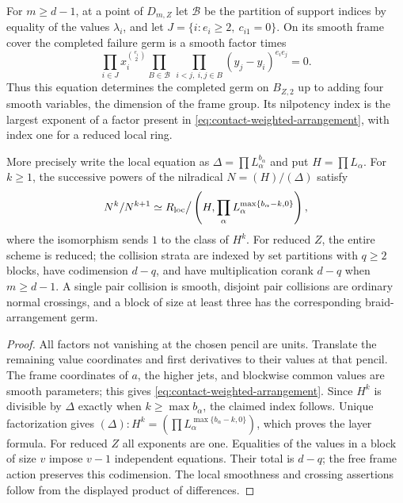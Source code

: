 \begin{corollary}
\label{cor:contact-local-structure}
For $m\ge d-1$, at a point of $D_{m,Z}$ let $\mathcal B$ be the partition of support indices
by equality of the values $\lambda_i$, and let
$J=\{i:e_i\ge2,\ c_{i1}=0\}$. On its smooth frame cover the
completed failure germ is a smooth factor times
\begin{equation}\label{eq:contact-weighted-arrangement}
 \prod_{i\in J}x_i^{\binom{e_i}{2}}
 \prod_{B\in\mathcal B}\ \prod_{i<j,\ i,j\in B}
               (y_j-y_i)^{e_i e_j}=0.
\end{equation}
Thus this equation determines the completed germ on $B_{Z,2}$
up to adding four smooth variables, the dimension of the frame
group. Its nilpotency index is the largest exponent of a factor
present in \eqref{eq:contact-weighted-arrangement}, with index one
for a reduced local ring.

More precisely write the local equation as $\Delta=\prod L_\alpha^{b_\alpha}$
and put $H=\prod L_\alpha$. For $k\ge1$, the successive powers
of the nilradical $N=(H)/(\Delta)$ satisfy
\begin{equation}\label{eq:contact-nilradical-layers}
 N^k/N^{k+1}
 \simeq R_{\rm loc}\big/
 \left(H,\prod_\alpha L_\alpha^{\max\{b_\alpha-k,0\}}\right),
\end{equation}
where the isomorphism sends $1$ to the class of $H^k$.
For reduced $Z$, the entire scheme is reduced; the collision
strata are indexed by set partitions with $q\ge2$ blocks, have
codimension $d-q$, and have multiplication corank $d-q$ when
$m\ge d-1$. A single pair collision is smooth, disjoint pair
collisions are ordinary normal crossings, and a block of size at
least three has the corresponding braid-arrangement germ.
\end{corollary}
\begin{proof}
All factors not vanishing at the chosen pencil are units. Translate
the remaining value coordinates and first derivatives to their
values at that pencil. The frame coordinates of $a$, the higher
jets, and blockwise common values are smooth parameters; this gives
\eqref{eq:contact-weighted-arrangement}. Since $H^k$ is divisible
by $\Delta$ exactly when $k\ge\max b_\alpha$, the claimed index
follows. Unique factorization gives
$(\Delta):H^k=(\prod L_\alpha^{\max\{b_\alpha-k,0\}})$,
which proves the layer formula. For reduced $Z$ all exponents are
one. Equalities of the values in a block of size $v$ impose $v-1$
independent equations. Their total is $d-q$; the free frame action
preserves this codimension. The local smoothness and crossing
assertions follow from the displayed product of differences.
\end{proof}


